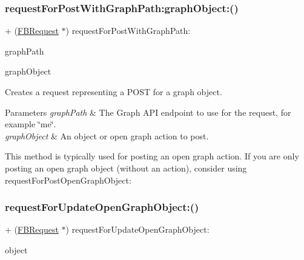 \subsubsection{\texorpdfstring{request\+For\+Post\+With\+Graph\+Path\+:graph\+Object\+:()}{requestForPostWithGraphPath:graphObject:()}\hspace{0.1cm}{\footnotesize\ttfamily [5/5]}}
{\footnotesize\ttfamily + (\hyperlink{interfaceFBRequest}{F\+B\+Request} $\ast$) request\+For\+Post\+With\+Graph\+Path\+: \begin{DoxyParamCaption}\item[{(N\+S\+String $\ast$)}]{graph\+Path }\item[{graphObject:(id$<$ \hyperlink{interfaceFBGraphObject}{F\+B\+Graph\+Object} $>$)}]{graph\+Object }\end{DoxyParamCaption}}

Creates a request representing a P\+O\+ST for a graph object.


\begin{DoxyParams}{Parameters}
{\em graph\+Path} & The Graph A\+PI endpoint to use for the request, for example \char`\"{}me\char`\"{}.\\
\hline
{\em graph\+Object} & An object or open graph action to post.\\
\hline
\end{DoxyParams}
This method is typically used for posting an open graph action. If you are only posting an open graph object (without an action), consider using {\ttfamily request\+For\+Post\+Open\+Graph\+Object\+:} \mbox{\label{interfaceFBRequest_ab92e50866d79923cfb17f1f96f06530b}} 
\subsubsection{\texorpdfstring{request\+For\+Update\+Open\+Graph\+Object\+:()}{requestForUpdateOpenGraphObject:()}\hspace{0.1cm}{\footnotesize\ttfamily [1/5]}}
{\footnotesize\ttfamily + (\hyperlink{interfaceFBRequest}{F\+B\+Request} $\ast$) request\+For\+Update\+Open\+Graph\+Object\+: \begin{DoxyParamCaption}\item[{(id$<$ \hyperlink{protocolFBOpenGraphObject-p}{F\+B\+Open\+Graph\+Object} $>$)}]{object }\end{DoxyParamCaption}}

